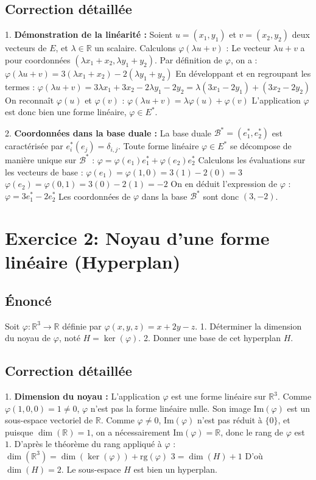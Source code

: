\documentclass{report}
\begin{document}
\section*{Correction détaillée}
1. \textbf{Démonstration de la linéarité :}
   Soient $u = (x_1, y_1)$ et $v = (x_2, y_2)$ deux vecteurs de $E$, et $\lambda \in \mathbb{R}$ un scalaire.
   Calculons $\varphi(\lambda u + v)$ :
   Le vecteur $\lambda u + v$ a pour coordonnées $(\lambda x_1 + x_2, \lambda y_1 + y_2)$.
   Par définition de $\varphi$, on a :
   $\varphi(\lambda u + v) = 3(\lambda x_1 + x_2) - 2(\lambda y_1 + y_2)$
   En développant et en regroupant les termes :
   $\varphi(\lambda u + v) = 3\lambda x_1 + 3x_2 - 2\lambda y_1 - 2y_2 = \lambda(3x_1 - 2y_1) + (3x_2 - 2y_2)$
   On reconnaît $\varphi(u)$ et $\varphi(v)$ :
   $\varphi(\lambda u + v) = \lambda \varphi(u) + \varphi(v)$
   L'application $\varphi$ est donc bien une forme linéaire, $\varphi \in E^*$.

2. \textbf{Coordonnées dans la base duale :}
   La base duale $\mathcal{B}^* = (e_1^*, e_2^*)$ est caractérisée par $e_i^*(e_j) = \delta_{i,j}$.
   Toute forme linéaire $\varphi \in E^*$ se décompose de manière unique sur $\mathcal{B}^*$ :
   $\varphi = \varphi(e_1)e_1^* + \varphi(e_2)e_2^*$
   Calculons les évaluations sur les vecteurs de base :
   $\varphi(e_1) = \varphi(1, 0) = 3(1) - 2(0) = 3$
   $\varphi(e_2) = \varphi(0, 1) = 3(0) - 2(1) = -2$
   On en déduit l'expression de $\varphi$ :
   $\varphi = 3e_1^* - 2e_2^*$
   Les coordonnées de $\varphi$ dans la base $\mathcal{B}^*$ sont donc $(3, -2)$.


\newpage
\chapter*{Exercice 2: Noyau d'une forme linéaire (Hyperplan)}
\section*{Énoncé}
Soit $\varphi : \mathbb{R}^3 \to \mathbb{R}$ définie par $\varphi(x, y, z) = x + 2y - z$.
1. Déterminer la dimension du noyau de $\varphi$, noté $H = \ker(\varphi)$.
2. Donner une base de cet hyperplan $H$.


\section*{Correction détaillée}
1. \textbf{Dimension du noyau :}
   L'application $\varphi$ est une forme linéaire sur $\mathbb{R}^3$. Comme $\varphi(1, 0, 0) = 1 \neq 0$, $\varphi$ n'est pas la forme linéaire nulle.
   Son image $\text{Im}(\varphi)$ est un sous-espace vectoriel de $\mathbb{R}$. Comme $\varphi \neq 0$, $\text{Im}(\varphi)$ n'est pas réduit à $\{0\}$, et puisque $\dim(\mathbb{R}) = 1$, on a nécessairement $\text{Im}(\varphi) = \mathbb{R}$, donc le rang de $\varphi$ est $1$.
   D'après le théorème du rang appliqué à $\varphi$ :
   $\dim(\mathbb{R}^3) = \dim(\ker(\varphi)) + \text{rg}(\varphi)$
   $3 = \dim(H) + 1$
   D'où $\dim(H) = 2$. Le sous-espace $H$ est bien un hyperplan.
\end{document}
